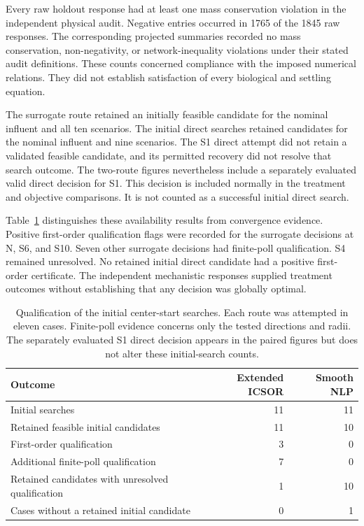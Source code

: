 Every raw holdout response had at least one mass conservation violation in the independent physical audit. Negative entries occurred in 1765 of the 1845 raw responses. The corresponding projected summaries recorded no mass conservation, non-negativity, or network-inequality violations under their stated audit definitions. These counts concerned compliance with the imposed numerical relations. They did not establish satisfaction of every biological and settling equation.

The surrogate route retained an initially feasible candidate for the nominal influent and all ten scenarios. The initial direct searches retained candidates for the nominal influent and nine scenarios. The S1 direct attempt did not retain a validated feasible candidate, and its permitted recovery did not resolve that search outcome. The two-route figures nevertheless include a separately evaluated valid direct decision for S1. This decision is included normally in the treatment and objective comparisons. It is not counted as a successful initial direct search.

Table~\ref{tab:plant_search_qualification_results} distinguishes these availability results from convergence evidence. Positive first-order qualification flags were recorded for the surrogate decisions at N, S6, and S10. Seven other surrogate decisions had finite-poll qualification. S4 remained unresolved. No retained initial direct candidate had a positive first-order certificate. The independent mechanistic responses supplied treatment outcomes without establishing that any decision was globally optimal.

\begin{table}[htbp]
\centering\small
\caption{Qualification of the initial center-start searches. Each route was attempted in eleven cases. Finite-poll evidence concerns only the tested directions and radii. The separately evaluated S1 direct decision appears in the paired figures but does not alter these initial-search counts.}
\label{tab:plant_search_qualification_results}
\begin{tabular}{p{7.0cm}rr}
\toprule
Outcome & Extended ICSOR & Smooth NLP\\
\midrule
Initial searches & 11 & 11\\
Retained feasible initial candidates & 11 & 10\\
First-order qualification & 3 & 0\\
Additional finite-poll qualification & 7 & 0\\
Retained candidates with unresolved qualification & 1 & 10\\
Cases without a retained initial candidate & 0 & 1\\
\bottomrule
\end{tabular}
\end{table}

